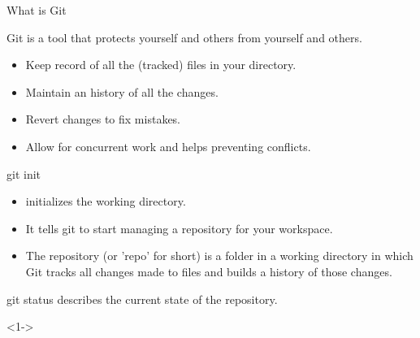 \begin{frame}[fragile]{What is Git}
			
	Git is a tool that protects yourself and others from yourself and others.
		
	\begin{itemize}
		\item <2-> Keep record of all the (tracked) files in your directory.
		\item <3-> Maintain an history of all the changes.
		\item <4-> Revert changes to fix mistakes.
		\item <5-> Allow for concurrent work and helps preventing conflicts.
	\end{itemize}
		
			
\end{frame}

\begin{frame}[fragile]{git init}
	\begin{itemize}[<+->]
		\item  {} initializes the working directory.
		      		      
		\item It tells git to start managing a \alert{repository} for your workspace.
		      		       
		\item The repository (or 'repo' for short) is a folder in a working directory in which Git tracks all changes made to files and builds a history of those changes.
		      		       
	\end{itemize}
\end{frame}

\begin{frame}[fragile]{git status}
     describes the current state of the repository.

	\begin{shellblock}<1->{
}\end{shellblock}
		      		       
\end{frame}

